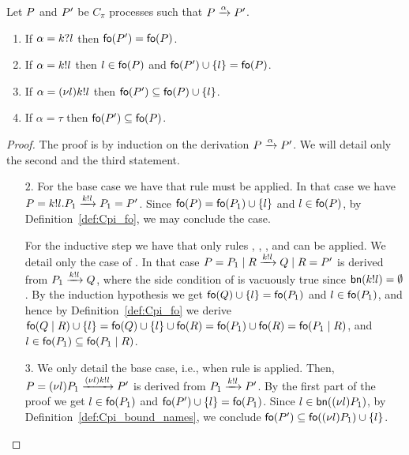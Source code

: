 \begin{lemma}\label{lemm:fo-and-transitions}
Let $P$ and $P'$ be $C_\pi$ processes such that $P\xrightarrow{\alpha}P'$. 
\begin{enumerate}
\item If $\alpha=k?l$ then $\mathsf{fo}(P')=\mathsf{fo}(P)$.
\item If $\alpha=k!l$ then $l\in\mathsf{fo}(P)$ and $\mathsf{fo}(P')\cup\{l\} = \mathsf{fo}(P)$.
\item If $\alpha=(\nu l)k!l$ then %
$\mathsf{fo}(P')\subseteq\mathsf{fo}(P)\cup\{l\}$.
\item If $\alpha=\tau$ then $\mathsf{fo}(P')\subseteq\mathsf{fo}(P)$.
\end{enumerate}
\end{lemma}
\begin{proof}
The proof is by induction on the derivation $P\xrightarrow{\alpha}P'$. 
We will detail only the second and the third statement.
\begin{itemize}
\item [$\mathit{2}.$] For the base case we have that rule  must be applied. In that case we have $P=k!l.P_1\xrightarrow{k!l}P_1=P'$. 
Since $\mathsf{fo}(P)=\mathsf{fo}(P_1)\cup\{l\}$ and $l\in\mathsf{fo}(P)$, by Definition~\ref{def:Cpi_fo}, we may conclude the case.

For the inductive step we have that only rules , , ,  and  can be applied. We detail only the case of  . 
In that case $P=P_1 \;|\; R \xrightarrow{k!l} Q \;|\; R=P'$ is derived from $P_1 \xrightarrow{k!l} Q$, where the side condition of  is vacuously true since $\mathsf{bn}(k!l)=\emptyset$. 
By the induction hypothesis we get $\mathsf{fo}(Q)\cup\{l\}=\mathsf{fo}(P_1)$ and $l\in\mathsf{fo}(P_1)$, and hence by Definition~\ref{def:Cpi_fo} we derive 
$\mathsf{fo}(Q \;|\; R)\cup \{l\}= \mathsf{fo}(Q)\cup \{l\} \cup\mathsf{fo}(R) =\mathsf{fo}(P_1)\cup\mathsf{fo}(R)=\mathsf{fo}(P_1 \;|\; R) $, 
and $l\in\mathsf{fo}(P_1)\subseteq\mathsf{fo}(P_1 \;|\; R)$.
%
%
\item [$\mathit{3}.$] We only detail the base case, i.e., when rule  is applied. 
Then, $P=(\nu l)P_1\xrightarrow{(\nu l)k!l}P'$ is derived from 
$P_1\xrightarrow{k!l}P'$. 
By the first part of the proof we get $l\in\mathsf{fo}(P_1)$ and $\mathsf{fo}(P')\cup\{l\}=\mathsf{fo}(P_1)$. 
Since $l\in\mathsf{bn}((\nu l)P_1)$, by Definition~\ref{def:Cpi_bound_names}, we conclude $\mathsf{fo}(P')\subseteq\mathsf{fo}((\nu l)P_1)\cup\{l\}$.
\end{itemize}
\end{proof}

